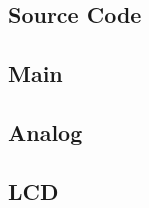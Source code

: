 \begin{appendices}
\section{Source Code}

\subsection{Main} \label{app:main}
\clearpage

\subsection{Analog} \label{app:analog}
\clearpage

\subsection{LCD} \label{app:lcd}
\clearpage

\end{appendices}

